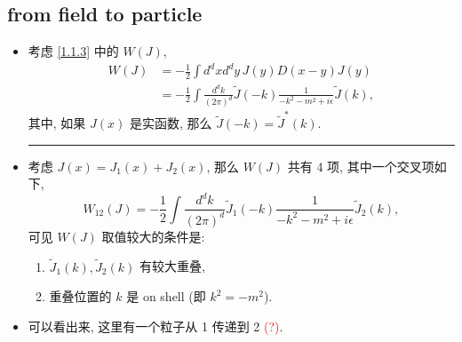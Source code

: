 \subsection{from field to particle}
\begin{itemize}
	\item 考虑 \eqref{1.1.3} 中的 $W(J)$,
	\begin{align}
		W(J) &= - \frac{1}{2} \int d^d x d^d y \, J(y) D(x - y) J(y) \\
		&= - \frac{1}{2} \int \frac{d^d k}{(2 \pi)^d} \tilde{J}(- k) \frac{1}{- k^2 - m^2 + i \epsilon} \tilde{J}(k),
	\end{align}
	其中, 如果 $J(x)$ 是实函数, 那么 $\tilde{J}(- k) = \tilde{J}^*(k)$.
	
	\noindent\rule[0.5ex]{\linewidth}{0.5pt} %
	
	\item 考虑 $J(x) = J_1(x) + J_2(x)$, 那么 $W(J)$ 共有 4 项, 其中一个交叉项如下,
	\begin{equation}
		W_{1 2}(J) = - \frac{1}{2} \int \frac{d^d k}{(2 \pi)^d} \tilde{J}_1(- k) \frac{1}{- k^2 - m^2 + i \epsilon} \tilde{J}_2(k),
	\end{equation}
	可见 $W(J)$ 取值较大的条件是:
	\begin{enumerate}
		\item $\tilde{J}_1(k), \tilde{J}_2(k)$ 有较大重叠,
		
		\item 重叠位置的 $k$ 是 on shell (即 $k^2 = - m^2$).
	\end{enumerate}
	
	\item 可以看出来, 这里有一个粒子从 1 传递到 2 \textcolor{red}{(?)}.
\end{itemize}

